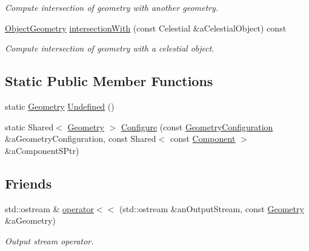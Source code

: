\begin{DoxyCompactItemize}
\begin{DoxyCompactList}\small\item\em Compute intersection of geometry with another geometry. \end{DoxyCompactList}\item 
\hyperlink{namespaceostk_1_1simulation_1_1component_a911837ab7e6f8471e9927a74795a0077}{Object\+Geometry} \hyperlink{classostk_1_1simulation_1_1component_1_1_geometry_ab36a969d150208ea070d214eff3d52d7}{intersection\+With} (const Celestial \&a\+Celestial\+Object) const
\begin{DoxyCompactList}\small\item\em Compute intersection of geometry with a celestial object. \end{DoxyCompactList}\end{DoxyCompactItemize}
\subsection*{Static Public Member Functions}
\begin{DoxyCompactItemize}
\item 
static \hyperlink{classostk_1_1simulation_1_1component_1_1_geometry}{Geometry} \hyperlink{classostk_1_1simulation_1_1component_1_1_geometry_aea7bd504788b09119889a7cc70c88703}{Undefined} ()
\item 
static Shared$<$ \hyperlink{classostk_1_1simulation_1_1component_1_1_geometry}{Geometry} $>$ \hyperlink{classostk_1_1simulation_1_1component_1_1_geometry_acec7bbd02a66a0fba781b4ab259ab7a5}{Configure} (const \hyperlink{structostk_1_1simulation_1_1component_1_1_geometry_configuration}{Geometry\+Configuration} \&a\+Geometry\+Configuration, const Shared$<$ const \hyperlink{classostk_1_1simulation_1_1_component}{Component} $>$ \&a\+Component\+S\+Ptr)
\end{DoxyCompactItemize}
\subsection*{Friends}
\begin{DoxyCompactItemize}
\item 
std\+::ostream \& \hyperlink{classostk_1_1simulation_1_1component_1_1_geometry_aebfe5b9b5d8cd3dd8a2cfd140a1df583}{operator$<$$<$} (std\+::ostream \&an\+Output\+Stream, const \hyperlink{classostk_1_1simulation_1_1component_1_1_geometry}{Geometry} \&a\+Geometry)
\begin{DoxyCompactList}\small\item\em Output stream operator. \end{DoxyCompactList}\end{DoxyCompactItemize}


